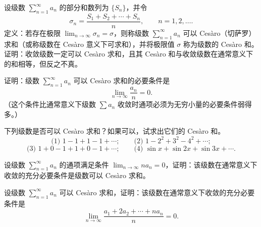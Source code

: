 \begin{xreferenceproblem}[18]
设级数 $\sum_{n=1}^{\infty}a_n$ 的部分和数列为 $\{S_n\}$，并令
\[
\sigma_n=\frac{S_1+S_2+\cdots+S_n}{n},\qquad n=1,2,\ldots.
\]
定义：若存在极限 $\lim_{n\to\infty}\sigma_n=\sigma$，则称级数 $\sum_{n=1}^{\infty}a_n$ 可以 Cesàro（切萨罗）求和（或称级数在 Cesàro 意义下可求和），并将极限值 $\sigma$ 称为级数的 Cesàro 和。证明：收敛级数一定可以 Cesàro 求和，且其 Cesàro 和与收敛级数在通常意义下的和相等，但反之不真。
\end{xreferenceproblem}

\begin{xreferenceproblem}[19]
证明：级数 $\sum_{n=1}^{\infty}a_n$ 可以 Cesàro 求和的必要条件是
\[
\lim_{n\to\infty}\frac{a_n}{n}=0.
\]
（这个条件比通常意义下级数 $\sum a_n$ 收敛时通项必须为无穷小量的必要条件弱得多。）
\end{xreferenceproblem}

\begin{xreferenceproblem}[20]
下列级数是否可以 Cesàro 求和？如果可以，试求出它们的 Cesàro 和。
\[
\text{(1) }1-1+1-1+\cdots;\qquad
\text{(2) }1-2^2+3^2-4^2+\cdots;
\]
\[
\text{(3) }1+0-1+1+0-1+\cdots;\qquad
\text{(4) }\sin x+\sin2x+\sin3x+\cdots.
\]
\end{xreferenceproblem}

\begin{xreferenceproblem}[21]
设级数 $\sum_{n=1}^{\infty}a_n$ 的通项满足条件 $\lim_{n\to\infty}na_n=0$，证明：该级数在通常意义下收敛的充分必要条件是级数可以 Cesàro 求和。
\end{xreferenceproblem}

\begin{xreferenceproblem}[22]
设级数 $\sum_{n=1}^{\infty}a_n$ 可以 Cesàro 求和，证明：该级数在通常意义下收敛的充分必要条件是
\[
\lim_{n\to\infty}\frac{a_1+2a_2+\cdots+na_n}{n}=0.
\]
\end{xreferenceproblem}
